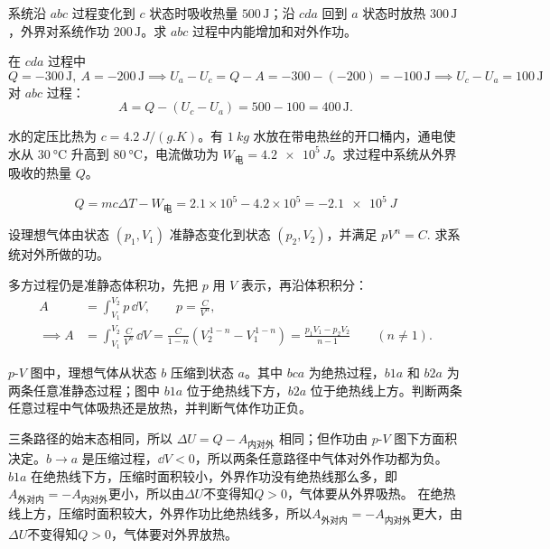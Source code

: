 \begin{exercise}
    系统沿 \(abc\) 过程变化到 \(c\) 状态时吸收热量 \(500\,\text{J}\)；沿 \(cda\) 回到 \(a\) 状态时放热 \(300\,\text{J}\)，外界对系统作功 \(200\,\text{J}\)。求 \(abc\) 过程中内能增加和对外作功。
\end{exercise}
\begin{solution}
在 \(cda\) 过程中
\[Q=-300\,\text{J},~A=-200\,\text{J}\implies U_a-U_c=Q-A=-300-(-200)=-100\,\text{J}\implies U_c-U_a=100\,\text{J}\]对 \(abc\) 过程：\[A=Q-(U_c-U_a)=500-100=400\,\text{J}.\]
\end{solution}


\begin{exercise}[电热丝加热开口水桶时怎样给 \(Q\) 判号]
水的定压比热为 \(c=\SI{4.2}{J/(g.K)}\)。有 \(\SI{1}{kg}\) 水放在带电热丝的开口桶内，通电使水从 \(\SI{30}{\celsius}\) 升高到 \(\SI{80}{\celsius}\)，电流做功为 \(W_{\text{电}}=\SI{4.2e5}{J}\)。求过程中系统从外界吸收的热量 \(Q\)。
\end{exercise}

\begin{solution}
 \[Q=mc\Delta T-W_{\text{电}} =2.1\times10^5-4.2\times10^5 =-\SI{2.1e5}{J}\]
\end{solution}

\begin{exercise}[多方关系下的准静态体积功]
设理想气体由状态 \((p_1,V_1)\) 准静态变化到状态 \((p_2,V_2)\)，并满足
 \(pV^n=C.\) 
求系统对外所做的功。
\end{exercise}

\begin{solution}
多方过程仍是准静态体积功，先把 \(p\) 用 \(V\) 表示，再沿体积积分：
\[
\begin{aligned}
A&=\int_{V_1}^{V_2}p\,\dd V,\qquad p=\frac{C}{V^n},\\
\implies A&=\int_{V_1}^{V_2}\frac{C}{V^n}\,\dd V
=\frac{C}{1-n}\left(V_2^{\,1-n}-V_1^{\,1-n}\right)=\frac{p_1V_1-p_2V_2}{n-1}\qquad (n\neq1).
\end{aligned}
\]
\end{solution}

\begin{exercise}
\(p\)-\(V\) 图中，理想气体从状态 \(b\) 压缩到状态 \(a\)。其中 \(bca\) 为绝热过程，\(b1a\) 和 \(b2a\) 为两条任意准静态过程；图中 \(b1a\) 位于绝热线下方，\(b2a\) 位于绝热线上方。判断两条任意过程中气体吸热还是放热，并判断气体作功正负。
\end{exercise}

\begin{solution}
三条路径的始末态相同，所以 \(\Delta U=Q-A_{\text{内对外}}\) 相同；但作功由 \(p\)-\(V\) 图下方面积决定。\(b\to a\) 是压缩过程，\(\dd V<0\)，所以两条任意路径中气体对外作功都为负。\(b1a\) 在绝热线下方，压缩时面积较小，外界作功没有绝热线那么多，即$A_{\text{外对内}}=-A_{\text{内对外}}$更小，所以由$\Delta U$不变得知$Q>0$，气体要从外界吸热。 在绝热线上方，压缩时面积较大，外界作功比绝热线多，所以$A_{\text{外对内}}=-A_{\text{内对外}}$更大，由$\Delta U$不变得知$Q>0$，气体要对外界放热。
\end{solution}

